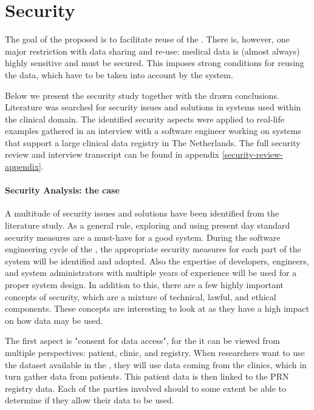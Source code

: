 \section{Security}
\label{security}

The goal of the proposed \ivfsystem{} is to facilitate reuse of the \projectdata{}.
There is, however, one major restriction with data sharing and re-use: medical data is (almost always) highly sensitive and must be secured. 
This imposes strong conditions for reusing the data, which have to be taken into account by the system.

Below we present the security study together with the drawn conclusions.
Literature was searched for security issues and solutions in systems used within the clinical domain.
The identified security aspects were applied to real-life examples gathered in an interview with a software engineer working on systems that support a large clinical data registry in The Netherlands.
The full security review and interview transcript can be found in appendix \ref{security-review-appendix}.

\paragraph{Security Analysis: the \ivfsystem{} case}
\label{security-summarisation-analysis}

A multitude of security issues and solutions have been identified from the literature study.
As a general rule, exploring and using present day standard security measures are a must-have for a good system.
During the software engineering cycle of the \ivfsystem{}, the appropriate security measures for each part of the system will be identified and adopted.
Also the expertise of developers, engineers, and system administrators with multiple years of experience will be used for a proper system design.
In addition to this, there are a few highly important concepts of security, which are a mixture of technical, lawful, and ethical components.
These concepts are interesting to look at as they have a high impact on how data may be used.

The first aspect is "consent for data access", for the \project{} it can be viewed from multiple perspectives: patient, clinic, and registry.
When researchers want to use the dataset available in the \ivfsystem{}, they will use data coming from the clinics, which in turn gather data from patients.
This patient data is then linked to the PRN registry data.
Each of the parties involved should to some extent be able to determine if they allow their data to be used.

